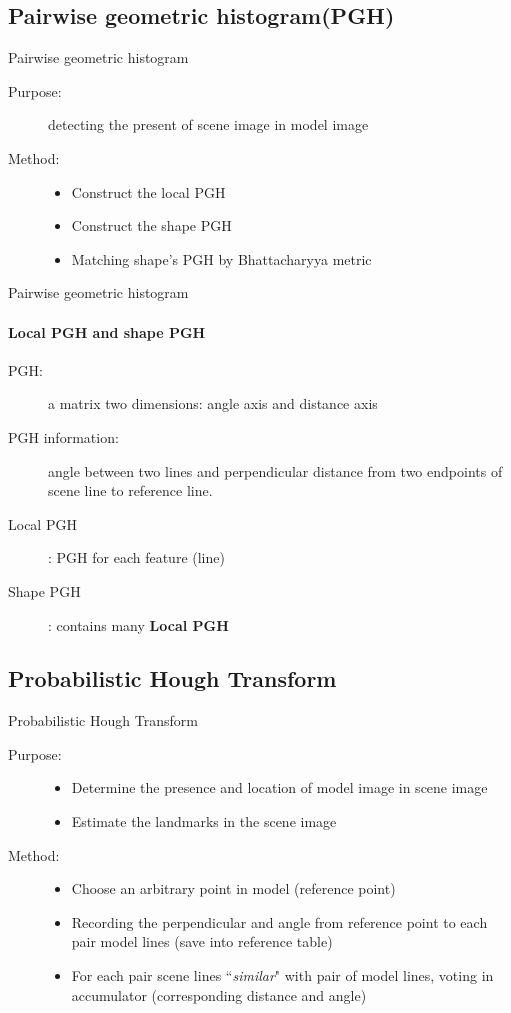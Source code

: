 \documentclass{beamer}
\begin{document}
\subsection{Pairwise geometric histogram(PGH)}
\begin{frame}{Pairwise geometric histogram}
	\begin{description}
		\item[Purpose:] detecting the present of scene image in model image
		\item[Method:]
		\begin{itemize}
			\item Construct the local PGH
			\item Construct the shape PGH
			\item Matching shape's PGH by Bhattacharyya metric
		\end{itemize}
	\end{description}
\end{frame}
\begin{frame}{Pairwise geometric histogram}
	\framesubtitle{Local PGH and shape PGH}
	\begin{description}
		\item[PGH:] a matrix two dimensions: angle axis and distance axis
		\item[PGH information:] angle between two lines and perpendicular distance from two endpoints of scene line to reference line.
		\item[Local PGH]: PGH for each feature (line)
		\item[Shape PGH]: contains many \textbf{Local PGH}
	\end{description}
\end{frame}
\subsection{Probabilistic Hough Transform}
\begin{frame}{Probabilistic Hough Transform}
	\begin{description}
		\item[Purpose:]
			\begin{itemize}
				\item Determine the presence and location of model image in scene image
				\item Estimate the landmarks in the scene image
			\end{itemize}
		\item[Method:]
		\begin{itemize}
			\item Choose an arbitrary point in model (reference point)
			\item Recording the perpendicular and angle from reference point to each pair model lines (save into reference table)
			\item For each pair scene lines ``\textit{similar}" with pair of model lines, voting in accumulator (corresponding distance and angle)
		\end{itemize}
	\end{description}
\end{frame}
\end{document}
